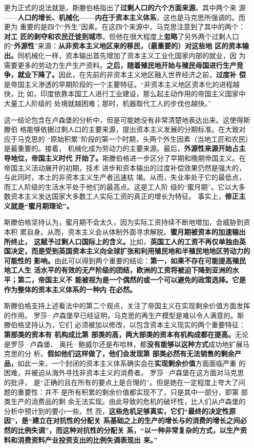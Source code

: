 更为正式的说法就是，斯滕伯格指出了\textbf{过剩人口的六个方面来源}。其中两个来
源——\textbf{人口的增长、机械化——内在于资本主义体系}，这也是马克思所强调的。而更为
重要的是四个“外生”因素。在这四个来源中，马克思注意到了其中的两个：\textbf{对工
  匠的剥夺和农民迁徙到城市}。但他在很大程度上\textbf{忽略}了另外两个过剩人口
的“\textbf{外源性}”来源：\textbf{从非资本主义地区来的移民，（最重要的）对这些地
  区的资本输出。}同机械化一样，资本输出首先增加了资本主义工业化国家内部的就业，因
为需要更多的劳动力生产生产资料。\textbf{之后，随着殖民地开始与殖民母国进行生产竞
  争，就业下降了。}因此，在先前的非资本主义地区融入世界经济之前，\textbf{过度补
  偿}是帝国主义渗透的早期阶段的一个主要特征。“非资本主义地区资本化的进程越快，比
如，印度依靠本国工人进行工业建设，那么起主动作用的帝国主义国家中大量工人阶级的
处境就越困难；那时，机器取代工人的步伐也越快。”

这一结论包含在卢森堡的分析中，但是可能她没有非常清楚地表达出来。这使得斯滕伯
格能够依据过剩人口的主要来源，提出资本主义发展的分期标准。在大致对应于马克思的
“原始积累”阶段的第一个时期，头两个外生因素（当地工匠和农民）是最重要的。接着，
机械化成为劳动力的主要来源。最后，\textbf{外源性来源开始占主导地位，帝国主义时代
开始了。}斯滕伯格进一步区分了早期和晚期帝国主义。在帝国主义活动展开的初期，技术
进步和资本输出的过度补偿效果仍然是强大的，与此同时，本土的非资本主义生产者迅速枯
竭。从而，失业率处于它的最低点，而工人阶级的生活水平处于他们的最高点。这是工人阶
级的“蜜月期”。它以大多数资本主义发达国家大多数工人实际工资的真正的增长为特征。
事实上，\textbf{修正主义就是“蜜月期理论”。}

斯滕伯格坚持认为，蜜月期不会太久，因为实际工资持续不断地增加，会威胁到资本积
累自身。从而，资本主义会从体制外面寻求解脱。\textbf{蜜月期被资本的加速输出所终止，
这赋予过剩人口国际上的含义。}比如，\textbf{英国工人的工资不再仅单独由英
国决定，而是受到英国资本主义向全球扩张和利用殖民地和半殖民地地区劳动力的可能性的
影响。}由此可以得到两个重要的结论：\textbf{第一，如果不存在可能提高殖民地工人生
活水平的有效的无产阶级的团结，欧洲的工资将被迫下降到亚洲的水平；第二，帝国主义不
能被视为是一个偶然的或一个可以避免的政策选择。它是作为整体的资本主义体系的一种内
在必然。}

斯滕伯格支持上述看法中的第二个观点，关注了帝国主义在实现剩余价值方面发挥的作用。
罗莎·卢森堡早已经证明，马克思的再生产模型是难以令人满意的。斯滕伯格坚持认为，它们
必须被加以修改，以包含资本主义现实的两个重要特征：\textbf{第部类的资本有
  机构成比第 部类的高，两大部类的资本有机构成都在提高。}无论是罗莎·卢森堡、
奥托·鲍威尔还是布哈林，都\textbf{没有能够以这种方式}成功地扩展马克思的分
析。\textbf{假如他们这样做了，他们会发现第 部类必然有无法销售的剩余产
  品，}如此一来，一个封闭的资本主义体系确实会在\textbf{实现剩余价值}方面面临严重
的困难，并被迫从海外寻找非资本主义的消费者。 罗莎·卢森堡在这方面对马克思的批评，
是“正确的且在所有的要点上是合理的”。但是她在一定程度上夸大了问题的重要性：并不
是所有积累的剩余价值都实现不了，只是其中一部分，即第 部类生产的消费品的剩
余无法实现。由此导致的危机的破坏性，比人们从卢森堡的分析中预计到的要小一些。然
而，\textbf{这些危机足够真实，它们“最终的决定性原因”，是“建立在对抗性的分配关
  系基础之上的生产的增长与的消费的增长之间必然的比例失调”，而这种对抗性的分配关
  系，“以一种非常复杂的方式，以生产资料和消费资料产业投资支出的比例失调表现出
  来。” }

